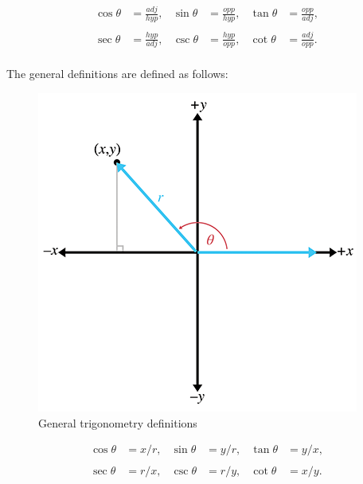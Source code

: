 \documentclass[a4paper,11pt]{article}
\begin{document}
\[\begin{matrix}
{\cos\theta} & {= \frac{\mathit{a}\mathit{d}\mathit{j}}{\mathit{h}\mathit{y}\mathit{p}},} & {\sin\theta} & {= \frac{\mathit{o}\mathit{p}\mathit{p}}{\mathit{h}\mathit{y}\mathit{p}},} & {\tan\theta} & {= \frac{\mathit{o}\mathit{p}\mathit{p}}{\mathit{a}\mathit{d}\mathit{j}},} \\
 & & & & & \\
{\sec\theta} & {= \frac{\mathit{h}\mathit{y}\mathit{p}}{\mathit{a}\mathit{d}\mathit{j}},} & {\csc\theta} & {= \frac{\mathit{h}\mathit{y}\mathit{p}}{\mathit{o}\mathit{p}\mathit{p}},} & {\cot\theta} & {= \frac{\mathit{a}\mathit{d}\mathit{j}}{\mathit{o}\mathit{p}\mathit{p}}.} \\
\end{matrix}\]

The general definitions are defined as follows:
\begin{figure}[H]
\centering
    \includegraphics{01_general_trigonometry_definitions}
\caption{General trigonometry definitions}
\label{fig:general-trigonometry-definitions}
\end{figure}

\[\begin{matrix}
{\cos\theta} & {= x/r,} & {\sin\theta} & {= y/r,} & {\tan\theta} & {= y/x,} \\
 & & & & & \\
{\sec\theta} & {= r/x,} & {\csc\theta} & {= r/y,} & {\cot\theta} & {= x/y.} \\
\end{matrix}\]
\end{document}
